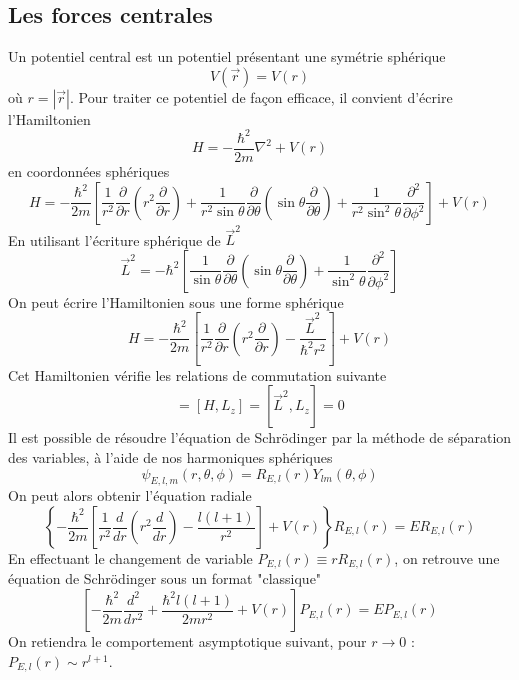 \subsection{Les forces centrales}
Un potentiel central est un potentiel présentant une symétrie sphérique
\begin{equation}
V(\vec{r}) = V(r)
\end{equation}
où $r = |\vec r|$. Pour traiter ce potentiel de façon efficace, il convient d'écrire l'Hamiltonien 
\begin{equation}
H = -\frac{\hbar^2}{2m}\nabla^2+V(r)
\end{equation}
en coordonnées sphériques
\begin{equation}
H = -\frac{\hbar^2}{2m}\left[\frac{1}{r^2}\frac{\partial}{\partial r}\left(r^2\frac{\partial}{\partial r}\right)
+\frac{1}{r^2\sin\theta}\frac{\partial}{\partial \theta}\left(\sin\theta\frac{\partial}{\partial \theta}\right)
+ \frac{1}{r^2\sin^2\theta}\frac{\partial^2}{\partial \phi^2}\right] + V(r)
\end{equation}
En utilisant l'écriture sphérique de $\vec{L}^2$
\begin{equation}
\vec L^2 = -\hbar^2\left[\frac{1}{\sin\theta}\frac{\partial}{\partial \theta}\left(\sin\theta\frac{\partial}{
\partial \theta}\right)+\frac{1}{\sin^2\theta}\frac{\partial^2}{\partial\phi^2}\right]
\end{equation}
On peut écrire l'Hamiltonien sous une forme sphérique
\begin{equation}
H=-\frac{\hbar^2}{2m}\left[\frac{1}{r^2}\frac{\partial}{\partial r}\left(r^2\frac{\partial}{\partial r}\right)
-\frac{\vec L^2}{\hbar^2 r^2}\right] + V(r)
\end{equation}
Cet Hamiltonien vérifie les relations de commutation suivante
\begin{equation}
[H,\vec{L}^2] = [H,L_z] = [\vec{L}^2,L_z] = 0
\end{equation}
Il est possible de résoudre l'équation de Schrödinger par la méthode de séparation des variables, à l'aide
de nos harmoniques sphériques
\begin{equation}
\psi_{E,l,m}(r,\theta,\phi) = R_{E,l}(r)Y_{lm}(\theta,\phi)
\end{equation}
On peut alors obtenir l'équation radiale
\begin{equation}
\left\{-\frac{\hbar^2}{2m}\left[\frac{1}{r^2}\frac{d}{dr}\left(r^2\frac{d}{dr}\right) - \frac{l(l+1)}{r^2}\right]+
V(r)\right\}R_{E,l}(r) = ER_{E,l}(r)
\end{equation}
En effectuant le changement de variable $P_{E,l}(r) \equiv rR_{E,l}(r)$, on retrouve une équation de 
Schrödinger sous un format "classique"
\begin{equation}
\left[-\frac{\hbar^2}{2m}\frac{d^2}{dr^2}+\frac{\hbar^2l(l+1)}{2mr^2}+V(r)\right]P_{E,l}(r) = EP_{E,l}(r)
\end{equation}
On retiendra le comportement asymptotique suivant, pour $r\to0$ : $P_{E,l}(r) \sim r^{l+1}$.\\


